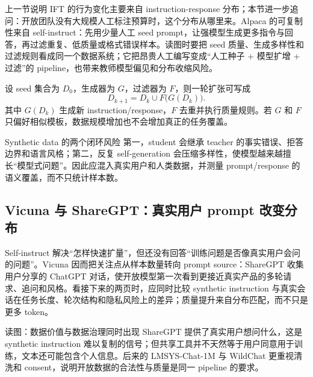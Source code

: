 上一节说明 IFT 的行为变化主要来自 instruction-response 分布；本节进一步追问：开放团队没有大规模人工标注预算时，这个分布从哪里来。Alpaca 的可复制性来自 self-instruct：先用少量人工 seed prompt，让强模型生成更多指令与回答，再过滤重复、低质量或格式错误样本。读图时要把 seed 质量、生成多样性和过滤规则看成同一个数据系统；它把昂贵人工编写变成“人工种子 + 模型扩增 + 过滤”的 pipeline，也带来教师模型偏见和分布收缩风险。


设 seed 集合为 $D_0$，生成器为 $G$，过滤器为 $F$，则一轮扩张可写成
\[
D_{k+1}=D_k\cup F\bigl(G(D_k)\bigr).
\]
其中 $G(D_k)$ 生成新 instruction/response，$F$ 去重并执行质量规则。若 $G$ 和 $F$ 只偏好相似模板，数据规模增加也不会增加真正的任务覆盖。

\begin{warningbox}{Synthetic data 的两个闭环风险}
第一，student 会继承 teacher 的事实错误、拒答边界和语言风格；第二，反复 self-generation 会压缩多样性，使模型越来越擅长“模型式问题”。因此应混入真实用户和人类数据，并测量 prompt/response 的语义覆盖，而不只统计样本数。
\end{warningbox}


\subsection{Vicuna 与 ShareGPT：真实用户 prompt 改变分布}

Self-instruct 解决“怎样快速扩量”，但还没有回答“训练问题是否像真实用户会问的问题”。Vicuna 因而把关注点从样本数量转向 prompt source：ShareGPT 收集用户分享的 ChatGPT 对话，使开放模型第一次看到更接近真实产品的多轮请求、追问和风格。看接下来的两页时，应同时比较 synthetic instruction 与真实会话在任务长度、轮次结构和隐私风险上的差异；质量提升来自分布匹配，而不只是更多 token。



\begin{knowledgebox}{读图：数据价值与数据治理同时出现}
ShareGPT 提供了真实用户想问什么，这是 synthetic instruction 难以复制的信号；但共享工具并不天然等于用户同意用于训练，文本还可能包含个人信息。后来的 LMSYS-Chat-1M 与 WildChat 更重视清洗和 consent，说明开放数据的合法性与质量是同一 pipeline 的要求。
\end{knowledgebox}

